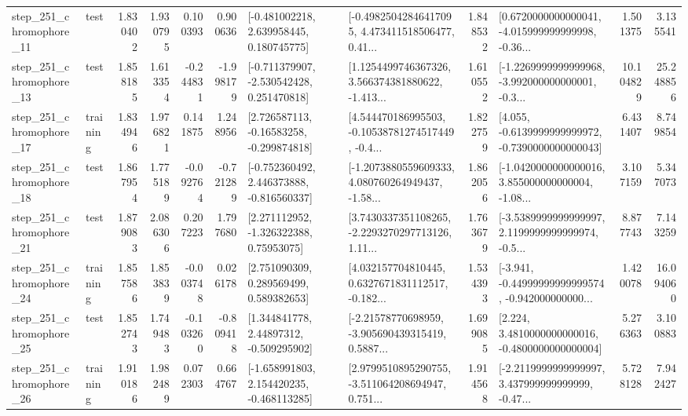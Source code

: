 \begin{tabular}{llrrrrllrlrr}
  step\_251\_chromophore\_11 &      test &      1.830402 &    1.930795 &      0.100393 &  0.900636 &    [-0.481002218, 2.639958445, 0.180745775] &  [-0.49825042846417095, 4.473411518506477, 0.41... &       1.848532 &  [0.6720000000000041, -4.015999999999998, -0.36... &            1.501375 &          3.135541 \\
  step\_251\_chromophore\_13 &      test &      1.858185 &    1.613354 &     -0.244831 & -1.998179 &   [-0.711379907, -2.530542428, 0.251470818] &  [1.1254499746367326, 3.566374381880622, -1.413... &       1.610552 &  [-1.2269999999999968, -3.992000000000001, -0.3... &           10.104829 &         25.248856 \\
  step\_251\_chromophore\_17 &  training &      1.834946 &    1.976821 &      0.141875 &  1.248956 &    [2.726587113, -0.16583258, -0.299874818] &  [4.544470186995503, -0.10538781274517449, -0.4... &       1.822759 &  [4.055, -0.6139999999999972, -0.7390000000000043] &            6.431407 &          8.749854 \\
  step\_251\_chromophore\_18 &      test &      1.867954 &    1.775189 &     -0.092764 & -0.721289 &   [-0.752360492, 2.446373888, -0.816560337] &  [-1.2073880559609333, 4.080760264949437, -1.58... &       1.862056 &  [-1.0420000000000016, 3.855000000000004, -1.08... &            3.107159 &          5.347073 \\
  step\_251\_chromophore\_21 &      test &      1.879083 &    2.086306 &      0.207223 &  1.797680 &     [2.271112952, -1.326322388, 0.75953075] &  [3.7430337351108265, -2.2293270297713126, 1.11... &       1.763679 &  [-3.5389999999999997, 2.1199999999999974, -0.5... &            8.877743 &          7.143259 \\
  step\_251\_chromophore\_24 &  training &      1.857586 &    1.853839 &     -0.003748 &  0.026178 &     [2.751090309, 0.289569499, 0.589382653] &  [4.032157704810445, 0.6327671831112517, -0.182... &       1.534393 &  [-3.941, -0.44999999999999574, -0.942000000000... &            1.420078 &         16.094060 \\
  step\_251\_chromophore\_25 &      test &      1.852743 &    1.749483 &     -0.103260 & -0.809418 &     [1.344841778, 2.44897312, -0.509295902] &  [-2.21578770698959, -3.905690439315419, 0.5887... &       1.699085 &   [2.224, 3.4810000000000016, -0.4800000000000004] &            5.276363 &          3.100883 \\
  step\_251\_chromophore\_26 &  training &      1.910186 &    1.982489 &      0.072303 &  0.664767 &   [-1.658991803, 2.154420235, -0.468113285] &  [2.9799510895290755, -3.511064208694947, 0.751... &       1.914568 &  [-2.2119999999999997, 3.437999999999999, -0.47... &            5.728128 &          7.942427 \\

\end{tabular}
